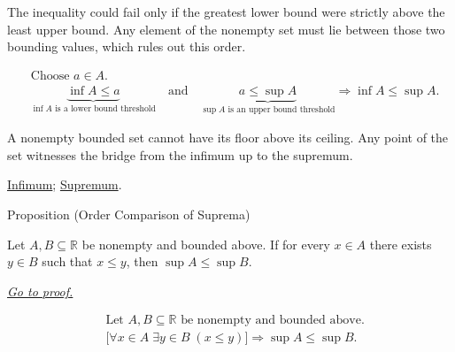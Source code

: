 \begin{remark*}
The inequality could fail only if the greatest lower bound were strictly above the least upper bound. Any element of the nonempty set must lie between those two bounding values, which rules out this order.
\end{remark*}

\begin{remark*}
\[
\begin{aligned}
&\text{Choose }a\in A.\\
&\underbrace{\inf A\le a}_{\inf A\text{ is a lower bound threshold}}
\quad\text{and}\quad
\underbrace{a\le \sup A}_{\sup A\text{ is an upper bound threshold}}
\Longrightarrow
\inf A\le \sup A.
\end{aligned}
\]
\end{remark*}

\begin{remark*}[Interpretation]
A nonempty bounded set cannot have its floor above its ceiling. Any point of the set witnesses the bridge from the infimum up to the supremum.
\end{remark*}

\begin{dependencies}
\hyperref[def:infimum]{Infimum};
\hyperref[def:supremum]{Supremum}.
\end{dependencies}


\begin{propositionbox}{Proposition (Order Comparison of Suprema)}
\begin{proposition}
\label{prop:order-comparison-of-suprema}
Let $A,B\subseteq\mathbb{R}$ be nonempty and bounded above. If for every $x\in A$ there exists $y\in B$ such that $x\le y$, then $\sup A\le \sup B$.

\smallskip
\noindent
\hyperref[prf:order-comparison-of-suprema]{\textit{Go to proof.}}
\end{proposition}
\end{propositionbox}

\begin{remark*}
\[
\begin{aligned}
&\text{Let }A,B\subseteq\mathbb{R}\text{ be nonempty and bounded above.}\\
&\bigl[\forall x\in A\;\exists y\in B\;(x\le y)\bigr]
\Longrightarrow
\sup A\le \sup B.
\end{aligned}
\]
\end{remark*}

